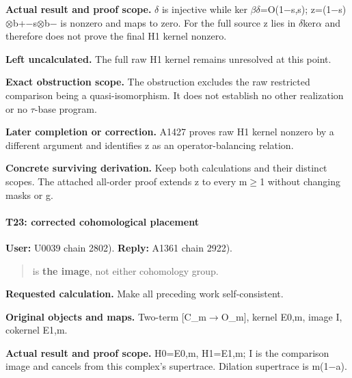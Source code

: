 \textbf{Actual result and proof scope.}
\allowbreak{}\ensuremath{δ}\allowbreak{} is injective while ker
\allowbreak{}\ensuremath{β}\allowbreak{}\allowbreak{}\ensuremath{δ}\allowbreak{}=O(1\allowbreak{}\ensuremath{−}\allowbreak{}s,s);
z=(1\allowbreak{}\ensuremath{−}\allowbreak{}s)\allowbreak{}\ensuremath{⊗}\allowbreak{}b+\allowbreak{}\ensuremath{−}\allowbreak{}s\allowbreak{}\ensuremath{⊗}\allowbreak{}b\allowbreak{}\ensuremath{−}\allowbreak{}
is nonzero and maps to zero. For the full source z lies in
\allowbreak{}\ensuremath{δ}\allowbreak{}ker\allowbreak{}\ensuremath{α}\allowbreak{}
and therefore does not prove the final H1 kernel nonzero.

\textbf{Left uncalculated.} The full raw H1 kernel remains unresolved at
this point.

\textbf{Exact obstruction scope.} The obstruction excludes the raw
restricted comparison being a quasi-isomorphism. It does not establish
no other realization or no \allowbreak{}\ensuremath{τ}\allowbreak{}-base
program.

\textbf{Later completion or correction.} A1427 proves raw H1 kernel
nonzero by a different argument and identifies z as an
operator-balancing relation.

\textbf{Concrete surviving derivation.} Keep both calculations and their
distinct scopes. The attached all-order proof extends z to every
m\allowbreak{}\ensuremath{≥}\allowbreak{}1 without changing masks or g.

\paragraph{T23: corrected cohomological
placement}\label{t23-corrected-cohomological-placement}

\textbf{User:} U0039
\protect{} chain 2802).
\textbf{Reply:} A1361
\protect{} chain 2922).

\begin{quote}
is \textbf{the image}, not either cohomology group.
\end{quote}

\textbf{Requested calculation.} Make all preceding work self-consistent.

\textbf{Original objects and maps.} Two-term
[C\_m\allowbreak{}\ensuremath{→}\allowbreak{}O\_m], kernel E0,m, image
I, cokernel E1,m.

\textbf{Actual result and proof scope.} H0=E0,m, H1=E1,m; I is the
comparison image and cancels from this complex's supertrace. Dilation
supertrace is m(1\allowbreak{}\ensuremath{−}\allowbreak{}a).

